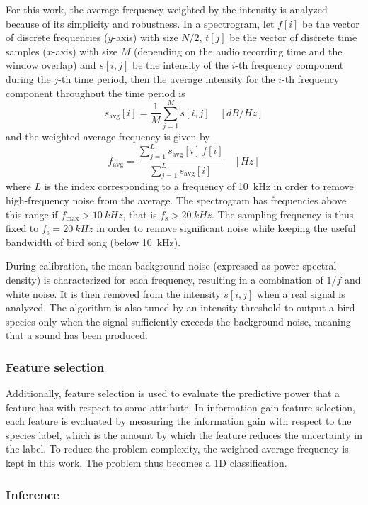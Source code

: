 \documentclass{EPL-master-thesis-covers-EN}
\newcommand{\te}[1]{\textrm{#1}}
\begin{document}
For this work, the average frequency weighted by the intensity is analyzed because of its simplicity and robustness. In a spectrogram, let $f[i]$ be the vector of discrete frequencies ($y$-axis) with size $N/2$, $t[j]$ be the vector of discrete time samples ($x$-axis) with size $M$ (depending on the audio recording time and the window overlap) and $s[i,j]$ be the intensity of the $i$-th frequency component during the $j$-th time period, then the average intensity for the $i$-th frequency component throughout the time period is
\[
 s_\te{avg}[i] = \frac{1}{M} \sum_{j=1}^{M} s[i,j] \quad [\si{dB/Hz}]
\]
and the weighted average frequency is given by
\[
 f_\te{avg} = \frac{\sum_{j=1}^{L} s_\te{avg}[i] \, f[i]}{\sum_{j=1}^{L} s_\te{avg}[i]} \quad [\si{Hz}]
\]
where $L$ is the index corresponding to a frequency of \SI{10}{kHz} in order to remove high-frequency noise from the average. The spectrogram has frequencies above this range if $f_\te{max} > \SI{10}{kHz}$, that is $f_\te{s} > \SI{20}{kHz}$. The sampling frequency is thus fixed to $f_\te{s} = \SI{20}{kHz}$ in order to remove significant noise while keeping the useful bandwidth of bird song (below \SI{10}{kHz}).

During calibration, the mean background noise (expressed as power spectral density) is characterized for each frequency, resulting in a combination of $1/f$ and white noise. It is then removed from the intensity $s[i,j]$ when a real signal is analyzed. The algorithm is also tuned by an intensity threshold to output a bird species only when the signal sufficiently exceeds the background noise, meaning that a sound has been produced.

\subsubsection*{Feature selection}

Additionally, feature selection is used to evaluate the predictive power that a feature has with respect to some attribute.
In information gain feature selection, each feature is evaluated by measuring the information gain with respect to the species label, which is the amount by which the feature reduces the uncertainty in the label. To reduce the problem complexity, the weighted average frequency is kept in this work. The problem thus becomes a 1D classification.

\subsubsection*{Inference}
\end{document}
